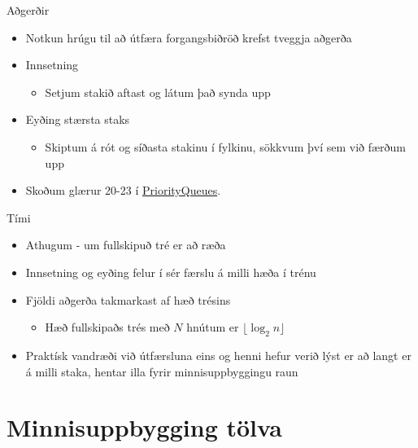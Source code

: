 \documentclass{beamer}
\begin{document}
\begin{frame}{Aðgerðir}
\begin{itemize}
 \item Notkun hrúgu til að útfæra forgangsbiðröð krefst tveggja aðgerða
 \item Innsetning
 \begin{itemize}
  \item Setjum stakið aftast og látum það synda upp
 \end{itemize}
 \item Eyðing stærsta staks
 \begin{itemize}
  \item Skiptum á rót og síðasta stakinu í fylkinu, sökkvum því sem við færðum upp
 \end{itemize}
 \item Skoðum glærur 20-23 í \href{http://algs4.cs.princeton.edu/lectures/24PriorityQueues.pdf}{PriorityQueues}.
\end{itemize}
\end{frame}

\begin{frame}{Tími}
\begin{itemize}
 \item Athugum - um fullskipuð tré er að ræða
 \item Innsetning og eyðing felur í sér færslu á milli hæða í trénu
 \item Fjöldi aðgerða takmarkast af hæð trésins
 \begin{itemize}
  \item Hæð fullskipaðs trés með $N$ hnútum er $\lfloor \log_2 n \rfloor$
 \end{itemize}
 \item Praktísk vandræði við útfærsluna eins og henni hefur verið lýst er að langt er á milli staka, hentar illa fyrir minnisuppbyggingu raun
\end{itemize}
\end{frame}

\section{Minnisuppbygging tölva}
\end{document}
